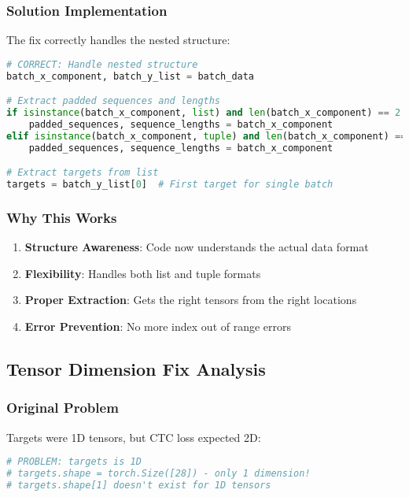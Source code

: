 \documentclass[11pt,a4paper]{article}
\begin{document}
\subsubsection{Solution Implementation}
The fix correctly handles the nested structure:

\begin{lstlisting}[language=Python, caption=Correct Data Extraction]
# CORRECT: Handle nested structure
batch_x_component, batch_y_list = batch_data

# Extract padded sequences and lengths
if isinstance(batch_x_component, list) and len(batch_x_component) == 2:
    padded_sequences, sequence_lengths = batch_x_component
elif isinstance(batch_x_component, tuple) and len(batch_x_component) == 2:
    padded_sequences, sequence_lengths = batch_x_component

# Extract targets from list
targets = batch_y_list[0]  # First target for single batch
\end{lstlisting}

\subsubsection{Why This Works}
\begin{enumerate}
    \item \textbf{Structure Awareness}: Code now understands the actual data format
    \item \textbf{Flexibility}: Handles both list and tuple formats
    \item \textbf{Proper Extraction}: Gets the right tensors from the right locations
    \item \textbf{Error Prevention}: No more index out of range errors
\end{enumerate}

\subsection{Tensor Dimension Fix Analysis}

\subsubsection{Original Problem}
Targets were 1D tensors, but CTC loss expected 2D:

\begin{lstlisting}[language=Python, caption=Dimension Mismatch]
# PROBLEM: targets is 1D
# targets.shape = torch.Size([28]) - only 1 dimension!
# targets.shape[1] doesn't exist for 1D tensors
\end{lstlisting}
\end{document}
